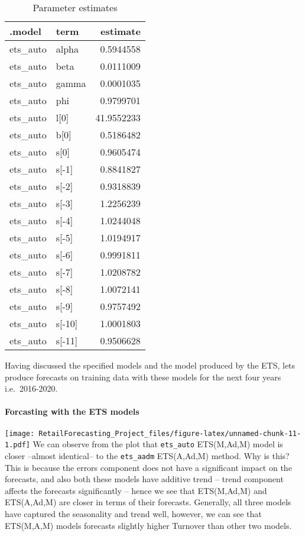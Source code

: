 \documentclass[
]{article}
\begin{document}
\begin{table}

\caption{\label{tab:unnamed-chunk-10}Parameter estimates}
\centering
\begin{tabular}[t]{l|l|r}
\hline
.model & term & estimate\\
\hline
ets\_auto & alpha & 0.5944558\\
\hline
ets\_auto & beta & 0.0111009\\
\hline
ets\_auto & gamma & 0.0001035\\
\hline
ets\_auto & phi & 0.9799701\\
\hline
ets\_auto & l[0] & 41.9552233\\
\hline
ets\_auto & b[0] & 0.5186482\\
\hline
ets\_auto & s[0] & 0.9605474\\
\hline
ets\_auto & s[-1] & 0.8841827\\
\hline
ets\_auto & s[-2] & 0.9318839\\
\hline
ets\_auto & s[-3] & 1.2256239\\
\hline
ets\_auto & s[-4] & 1.0244048\\
\hline
ets\_auto & s[-5] & 1.0194917\\
\hline
ets\_auto & s[-6] & 0.9991811\\
\hline
ets\_auto & s[-7] & 1.0208782\\
\hline
ets\_auto & s[-8] & 1.0072141\\
\hline
ets\_auto & s[-9] & 0.9757492\\
\hline
ets\_auto & s[-10] & 1.0001803\\
\hline
ets\_auto & s[-11] & 0.9506628\\
\hline
\end{tabular}
\end{table}

Having discussed the specified models and the model produced by the ETS,
lets produce forecasts on training data with these models for the next
four years i.e.~2016-2020.

\hypertarget{forcasting-with-the-ets-models}{%
\paragraph{Forcasting with the ETS
models}\label{forcasting-with-the-ets-models}}

\texttt{[image: RetailForecasting\_Project\_files/figure-latex/unnamed-chunk-11-1.pdf]}
We can observe from the plot that \texttt{ets\_auto} ETS(M,Ad,M) model
is closer --almost identical-- to the \texttt{ets\_aadm} ETS(A,Ad,M)
method. Why is this? This is because the errors component does not have
a significant impact on the forecasts, and also both these models have
additive trend -- trend component affects the forecasts significantly --
hence we see that ETS(M,Ad,M) and ETS(A,Ad,M) are closer in terms of
their forecasts. Generally, all three models have captured the
seasonality and trend well, however, we can see that ETS(M,A,M) models
forecasts slightly higher Turnover than other two models.
\end{document}
